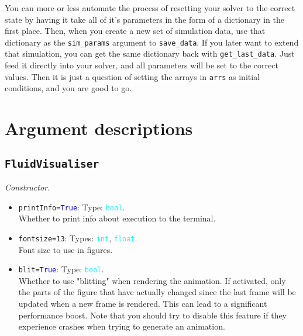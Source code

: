\documentclass{article}
\newcommand{\ttt}[1]{\texttt{#1}}
\newcommand{\ptype}[1]{\texttt{\textcolor{cyan}{#1}}}
\newcommand{\cbl}[1]{\textcolor{blue}{#1}}
\newcommand{\cro}[1]{\textcolor{RedOrange}{#1}}
\begin{document}
You can more or less automate the process of resetting your solver to the correct state by having it take all of it's parameters in the form of a dictionary in the first place. Then, when you create a new set of simulation data, use that dictionary as the \ttt{sim\_params} argument to \ttt{save\_data}. If you later want to extend that simulation, you can get the same dictionary back with \ttt{get\_last\_data}. Just feed it directly into your solver, and all parameters will be set to the correct values. Then it is just a question of setting the arrays in \ttt{arrs} as initial conditions, and you are good to go.

\section{Argument descriptions}
\label{sec:margs}
\subsection{\ttt{FluidVisualiser}}
\label{sec:const}
\textit{Constructor.}
\begin{itemize}
	\item \ttt{\cro{printInfo}=\cbl{True}}: Type: \ptype{bool}.\\Whether to print info about execution to the terminal.
	\item \ttt{\cro{fontsize}=13}: Types: \ptype{int}, \ptype{float}.\\Font size to use in figures.
	\item \ttt{\cro{blit}=\cbl{True}}: Type: \ptype{bool}.\\Whether to use "blitting" when rendering the animation. If activated, only the parts of the figure that have actually changed since the last frame will be updated when a new frame is rendered. This can lead to a significant performance boost. Note that you should try to disable this feature if they experience crashes when trying to generate an animation.
\end{itemize}
\end{document}
